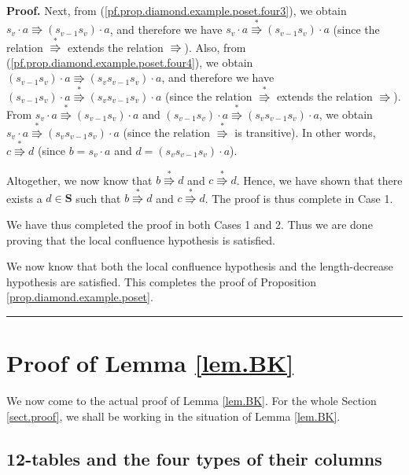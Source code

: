 \documentclass[numbers=enddot,12pt,final,onecolumn,notitlepage]{scrartcl}%
\theoremstyle{definition}
\newenvironment{proof}[1][Proof]{\noindent\textbf{#1.} }{\ \rule{0.5em}{0.5em}}
\newenvironment{verlong}{}{}
\begin{document}
\begin{proof}
\begin{verlong}
Next, from (\ref{pf.prop.diamond.example.poset.four3}), we obtain $s_{v}\cdot
a\Rrightarrow\left(  s_{v-1}s_{v}\right)  \cdot a$, and therefore we have
$s_{v}\cdot a\overset{\ast}{\Rrightarrow}\left(  s_{v-1}s_{v}\right)  \cdot a$
(since the relation $\overset{\ast}{\Rrightarrow}$ extends the relation
$\Rrightarrow$). Also, from (\ref{pf.prop.diamond.example.poset.four4}), we
obtain $\left(  s_{v-1}s_{v}\right)  \cdot a\Rrightarrow\left(  s_{v}%
s_{v-1}s_{v}\right)  \cdot a$, and therefore we have $\left(  s_{v-1}%
s_{v}\right)  \cdot a\overset{\ast}{\Rrightarrow}\left(  s_{v}s_{v-1}%
s_{v}\right)  \cdot a$ (since the relation $\overset{\ast}{\Rrightarrow}$
extends the relation $\Rrightarrow$). From $s_{v}\cdot a\overset{\ast
}{\Rrightarrow}\left(  s_{v-1}s_{v}\right)  \cdot a$ and $\left(  s_{v-1}%
s_{v}\right)  \cdot a\overset{\ast}{\Rrightarrow}\left(  s_{v}s_{v-1}%
s_{v}\right)  \cdot a$, we obtain $s_{v}\cdot a\overset{\ast}{\Rrightarrow
}\left(  s_{v}s_{v-1}s_{v}\right)  \cdot a$ (since the relation $\overset{\ast
}{\Rrightarrow}$ is transitive). In other words, $c\overset{\ast
}{\Rrightarrow}d$ (since $b=s_{v}\cdot a$ and $d=\left(  s_{v}s_{v-1}%
s_{v}\right)  \cdot a$).

Altogether, we now know that $b\overset{\ast}{\Rrightarrow}d$ and
$c\overset{\ast}{\Rrightarrow}d$. Hence, we have shown that there exists a
$d\in\mathbf{S}$ such that $b\overset{\ast}{\Rrightarrow}d$ and
$c\overset{\ast}{\Rrightarrow}d$. The proof is thus complete in Case 1.

We have thus completed the proof in both Cases 1 and 2. Thus we are done
proving that the local confluence hypothesis is satisfied.
\end{verlong}

We now know that both the local confluence hypothesis and the length-decrease
hypothesis are satisfied. This completes the proof of Proposition
\ref{prop.diamond.example.poset}.
\end{proof}

\section{\label{sect.proof}Proof of Lemma \ref{lem.BK}}

We now come to the actual proof of Lemma \ref{lem.BK}. For the whole Section
\ref{sect.proof}, we shall be working in the situation of Lemma \ref{lem.BK}.

\subsection{\label{subsect.fourtypes}12-tables and the four types of their
columns}
\end{document}
